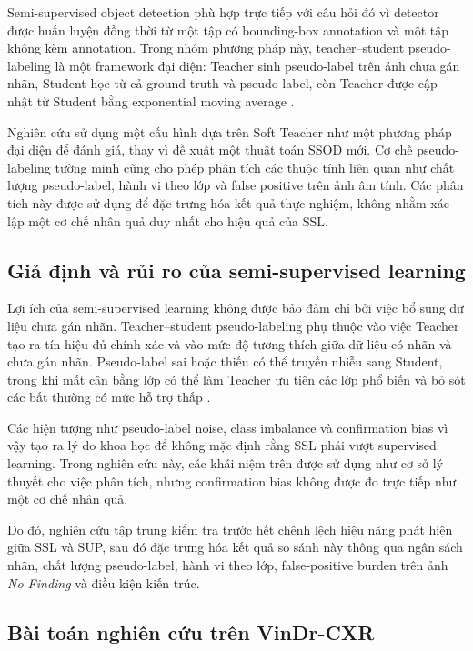 \documentclass[pdflatex,sn-mathphys-num]{sn-jnl}%
\theoremstyle{thmstyleone}%
\theoremstyle{thmstyletwo}%
\theoremstyle{thmstylethree}%
\begin{document}
Semi-supervised object detection phù hợp trực tiếp với câu hỏi đó vì detector
được huấn luyện đồng thời từ một tập có bounding-box annotation và một tập không
kèm annotation. Trong nhóm phương pháp này, teacher--student pseudo-labeling là
một framework đại diện: Teacher sinh pseudo-label trên ảnh chưa gán nhãn,
Student học từ cả ground truth và pseudo-label, còn Teacher được cập nhật từ
Student bằng exponential moving average
\cite{liu2021unbiased,xu2021end}.

Nghiên cứu sử dụng một cấu hình dựa trên Soft Teacher như một phương pháp đại
diện để đánh giá, thay vì đề xuất một thuật toán SSOD mới. Cơ chế pseudo-labeling
tường minh cũng cho phép phân tích các thuộc tính liên quan như chất lượng
pseudo-label, hành vi theo lớp và false positive trên ảnh âm tính. Các phân tích
này được sử dụng để đặc trưng hóa kết quả thực nghiệm, không nhằm xác lập một cơ
chế nhân quả duy nhất cho hiệu quả của SSL.


\subsection{Giả định và rủi ro của semi-supervised learning}

Lợi ích của semi-supervised learning không được bảo đảm chỉ bởi việc bổ sung dữ
liệu chưa gán nhãn. Teacher--student pseudo-labeling phụ thuộc vào việc Teacher
tạo ra tín hiệu đủ chính xác và vào mức độ tương thích giữa dữ liệu có nhãn và
chưa gán nhãn. Pseudo-label sai hoặc thiếu có thể truyền nhiễu sang Student,
trong khi mất cân bằng lớp có thể làm Teacher ưu tiên các lớp phổ biến và bỏ sót
các bất thường có mức hỗ trợ thấp
\cite{sohn2020simple,liu2021unbiased,xu2021end}.

Các hiện tượng như pseudo-label noise, class imbalance và confirmation bias vì
vậy tạo ra lý do khoa học để không mặc định rằng SSL phải vượt supervised
learning. Trong nghiên cứu này, các khái niệm trên được sử dụng như cơ sở lý
thuyết cho việc phân tích, nhưng confirmation bias không được đo trực tiếp như
một cơ chế nhân quả.

Do đó, nghiên cứu tập trung kiểm tra trước hết chênh lệch hiệu năng phát hiện giữa SSL và SUP, sau đó đặc trưng hóa kết quả so sánh này thông qua ngân sách
nhãn, chất lượng pseudo-label, hành vi theo lớp, false-positive burden trên ảnh
\textit{No Finding} và điều kiện kiến trúc.

\subsection{Bài toán nghiên cứu trên VinDr-CXR}
\end{document}
